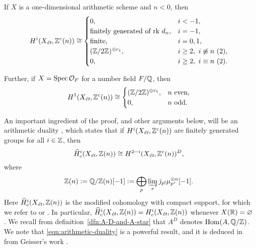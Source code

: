 \documentclass{article}
\numberwithin{equation}{section}
\begin{document}
\begin{proposition}
  \label{prop:structure-of-motivic-cohomology}
  If $X$ is a one-dimensional arithmetic scheme and $n < 0$, then
  \begin{equation}
    \label{eqn:structure-of-motivic-cohomology}
    H^i (X_\et, \ZZ^c (n)) \cong
    \begin{cases}
      0, & i < -1, \\
      \text{finitely generated of rk } d_n, & i = -1, \\
      \text{finite}, & i = 0,1, \\
      (\ZZ/2\ZZ)^{\oplus r_1}, & i \ge 2, ~ i\not\equiv n ~ (2), \\
      0, & i \ge 2, ~ i\equiv n ~ (2).
    \end{cases}
  \end{equation}

  Further, if $X = \Spec \mathcal{O}_F$ for a number field $F/\QQ$, then
  \begin{equation}
    \label{eqn:2-torsion-in-H1-Zc-for-Spec-OF}
    H^1 (X_\et, \ZZ^c (n)) \cong
    \begin{cases}
      (\ZZ/2\ZZ)^{\oplus r_1}, & n\text{ even}, \\
      0, & n \text{ odd}.
    \end{cases}
  \end{equation}
\end{proposition}

An important ingredient of the proof, and other arguments below, will be an
arithmetic duality \cite[Theorem~I]{Beshenov-Weil-etale-1}, which states that if
$H^i (X_\et, \ZZ^c (n))$ are finitely generated groups for all $i \in \ZZ$, then
\begin{equation}
  \label{eqn:arithmetic-duality}
  \widehat{H}^i_c (X_\et, \ZZ (n)) \cong
  H^{2-i} (X_\et, \ZZ^c (n))^D,
\end{equation}
where
\[ \ZZ (n) \dfn \QQ/\ZZ (n) [-1] \dfn
  \bigoplus_p \varinjlim_r j_{p!} \mu_{p^r}^{\otimes n} [-1]. \]
Here $\widehat{H}^i_c (X_\et, \ZZ (n))$ is the modified cohomology with compact
support, for which we refer to \cite[Appendix~B]{Beshenov-Weil-etale-1} or
\cite[\S 2]{Geisser-Schmidt-2018}. In particular,
$\widehat{H}^i_c (X_\et, \ZZ (n)) = H^i_c (X_\et, \ZZ (n))$ whenever
$X (\RR) = \emptyset$.
We recall from definition~\ref{dfn:A-D-and-A-star} that $A^D$ denotes
$\Hom (A, \QQ/\ZZ)$. We note that \eqref{eqn:arithmetic-duality} is a powerful
result, and it is deduced in \cite{Beshenov-Weil-etale-1} from Geisser's work
\cite{Geisser-2010}.
\end{document}
